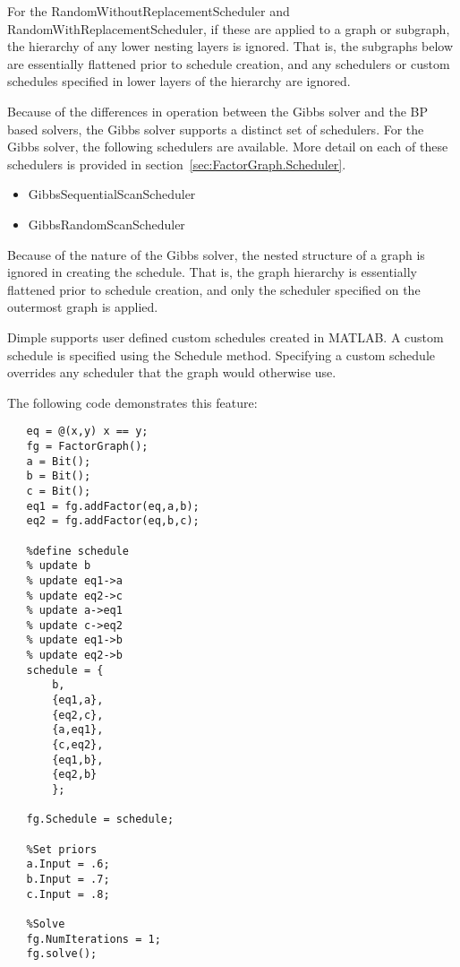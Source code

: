 For the RandomWithoutReplacementScheduler and RandomWithReplacementScheduler, if these are applied to a graph or subgraph, the hierarchy of any lower nesting layers is ignored.  That is, the subgraphs below are essentially flattened prior to schedule creation, and any schedulers or custom schedules specified in lower layers of the hierarchy are ignored.


Because of the differences in operation between the Gibbs solver and the BP based solvers, the Gibbs solver supports a distinct set of schedulers.  For the Gibbs solver, the following schedulers are available.  More detail on each of these schedulers is provided in section~\ref{sec:FactorGraph.Scheduler}.

\begin{itemize}
\item GibbsSequentialScanScheduler
\item GibbsRandomScanScheduler
\end{itemize}

Because of the nature of the Gibbs solver, the nested structure of a graph is ignored in creating the schedule.  That is, the graph hierarchy is essentially flattened prior to schedule creation, and only the scheduler specified on the outermost graph is applied.


\label{sec:CustomSchedules}


Dimple supports user defined custom schedules created in MATLAB.  A custom schedule is specified using the Schedule method.  Specifying a custom schedule overrides any scheduler that the graph would otherwise use.

The following code demonstrates this feature:

\begin{lstlisting}
   eq = @(x,y) x == y;
   fg = FactorGraph();
   a = Bit();
   b = Bit();
   c = Bit();
   eq1 = fg.addFactor(eq,a,b);
   eq2 = fg.addFactor(eq,b,c);
   
   %define schedule
   % update b
   % update eq1->a
   % update eq2->c
   % update a->eq1
   % update c->eq2
   % update eq1->b
   % update eq2->b
   schedule = {
       b,
       {eq1,a},
       {eq2,c},
       {a,eq1},
       {c,eq2},
       {eq1,b},
       {eq2,b}
       };
   
   fg.Schedule = schedule;
   
   %Set priors
   a.Input = .6;
   b.Input = .7;
   c.Input = .8;
   
   %Solve
   fg.NumIterations = 1;
   fg.solve();
\end{lstlisting}

